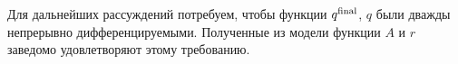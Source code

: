 \documentclass[../../doc.tex]{subfiles}
\begin{document}
    Для дальнейших рассуждений потребуем, чтобы функции $q^{\textnormal{final}}$, $q$ были дважды непрерывно дифференцируемыми.
    Полученные из модели функции $A$ и $r$ заведомо удовлетворяют этому требованию.

    \ifSubfilesClassLoaded{
        \nocite{*}
        \clearpage
        
        
    }{}
\end{document}
